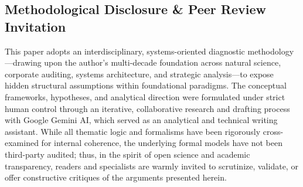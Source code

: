 \subsection*{Methodological Disclosure \& Peer Review Invitation}
\small
\noindent
This paper adopts an interdisciplinary, systems-oriented diagnostic methodology---drawing upon the author's multi-decade foundation across natural science, corporate auditing, systems architecture, and strategic analysis---to expose hidden structural assumptions within foundational paradigms. The conceptual frameworks, hypotheses, and analytical direction were formulated under strict human control through an iterative, collaborative research and drafting process with Google Gemini AI, which served as an analytical and technical writing assistant. While all thematic logic and formalisms have been rigorously cross-examined for internal coherence, the underlying formal models have not been third-party audited; thus, in the spirit of open science and academic transparency, readers and specialists are warmly invited to scrutinize, validate, or offer constructive critiques of the arguments presented herein.